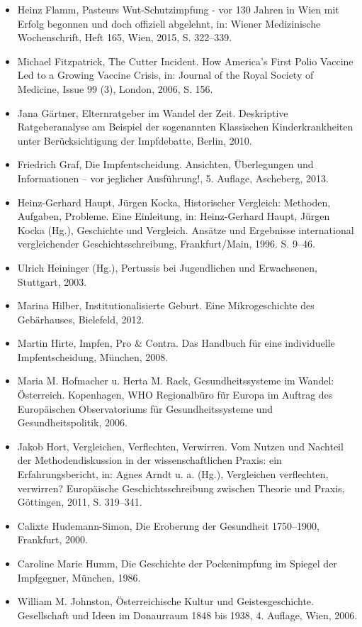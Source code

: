 \documentclass[
    a4paper,
    12pt,
    hyphens,
    chapterprefix=true,
    headheight=33pt,
    footheight=29pt,
    headings=optiontohead, %
]{scrartcl}
\begin{document}
{\begin{itemize}
\item{Heinz Flamm, Pasteurs Wut-Schutzimpfung - vor 130 Jahren in Wien mit Erfolg begonnen und doch offiziell abgelehnt, in: Wiener Medizinische Wochenschrift, Heft 165, Wien, 2015, S. 322--339.}
\item{Michael Fitzpatrick, The Cutter Incident. How America's First Polio Vaccine Led to a Growing Vaccine Crisis, in: Journal of the Royal Society of Medicine, Issue 99 (3), London, 2006, S. 156.}
\item{Jana Gärtner, Elternratgeber im Wandel der Zeit. Deskriptive Ratgeberanalyse am Beispiel der sogenannten Klassischen Kinderkrankheiten unter Berücksichtigung der Impfdebatte, Berlin, 2010.}
\item{Friedrich Graf, Die Impfentscheidung. Ansichten, Überlegungen und Informationen -- vor jeglicher Ausführung!, 5. Auflage, Ascheberg, 2013.}
\item{Heinz-Gerhard Haupt, Jürgen Kocka, Historischer Vergleich: Methoden, Aufgaben, Probleme. Eine Einleitung, in: Heinz-Gerhard Haupt, Jürgen Kocka (Hg.), Geschichte und Vergleich. Ansätze und Ergebnisse international vergleichender Geschichtsschreibung, Frankfurt/Main, 1996. S. 9--46.}
\item{Ulrich Heininger (Hg.), Pertussis bei Jugendlichen und Erwachsenen, Stuttgart, 2003.}
\item{Marina Hilber, Institutionalisierte Geburt. Eine Mikrogeschichte des Gebärhauses, Bielefeld, 2012.}
\item{Martin Hirte, Impfen, Pro \& Contra. Das Handbuch für eine individuelle Impfentscheidung, München, 2008.}
\item{Maria M. Hofmacher u. Herta M. Rack, Gesundheitssysteme im Wandel: Österreich. Kopenhagen, WHO Regionalbüro für Europa im Auftrag des Europäischen Observatoriums für Gesundheitssysteme und Gesundheitspolitik, 2006.}

\item{Jakob Hort, Vergleichen, Verflechten, Verwirren. Vom Nutzen und Nachteil der Methodendiskussion in der wissenschaftlichen Praxis: ein Erfahrungsbericht, in: Agnes Arndt u. a. (Hg.), Vergleichen verflechten, verwirren? Europäische  Geschichtsschreibung zwischen Theorie und Praxis, Göttingen, 2011, S. 319--341.}
\item{Calixte Hudemann-Simon, Die Eroberung der Gesundheit 1750--1900, Frankfurt, 2000.}
\item{Caroline Marie Humm, Die Geschichte der Pockenimpfung im Spiegel der Impfgegner, München, 1986.}
\item{William M. Johnston, Österreichische Kultur und Geistesgeschichte. Gesellschaft und Ideen im Donaurraum 1848 bis 1938, 4. Auflage, Wien, 2006.}


\end{itemize}}
\end{document}
